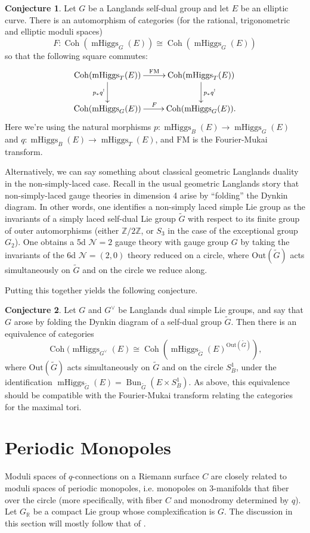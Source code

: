 \documentclass[11pt, oneside, reqno]{amsart}
\theoremstyle{definition} \newtheorem{definition}{Definition}[section]
\newtheorem{conjecture}[definition]{Conjecture}
\theoremstyle{definition} \newtheorem{remark}[definition]{Remark}
\theoremstyle{definition} \newtheorem{remarks}[definition]{Remarks}
\theoremstyle{definition} \newtheorem{question}[definition]{Question}
\theoremstyle{definition} \newtheorem*{note}{Note}
\theoremstyle{definition} \newtheorem{example}[definition]{Example}
\theoremstyle{definition} \newtheorem{examples}[definition]{Examples}
\newcommand{\mr}[1]{\mathrm{#1}}
\newcommand{\mc}[1]{\mathcal{#1}}
\newcommand{\wt}[1]{\widetilde{#1}}
\newcommand{\RR}{\mathbb{R}}
\newcommand{\ZZ}{\mathbb{Z}}
\newcommand{\iso}{\cong}
\DeclareMathOperator{\coh}{Coh}
\DeclareMathOperator{\bun}{Bun}
\DeclareMathOperator{\mhiggs}{mHiggs}
\begin{document}
\begin{conjecture}
Let $G$ be a Langlands self-dual group and let $E$ be an elliptic curve.  There is an automorphism of categories (for the rational, trigonometric and elliptic moduli spaces)
\[F \colon \coh(\mhiggs_G(E)) \iso \coh(\mhiggs_{G}(E))\]
so that the following square commutes:
\[\xymatrix{
\coh(\mhiggs_T(E)) \ar[r]^{\mathrm{FM}} \ar[d]_{p_*q^!} &\coh(\mhiggs_T(E)) \ar[d]^{p_*q^!} \\
\coh(\mhiggs_G(E)) \ar[r]^{F} &\coh(\mhiggs_G(E)).
}\]
Here we're using the natural morphisms $p \colon \mhiggs_B(E) \to \mhiggs_G(E)$ and $q \colon \mhiggs_B(E) \to \mhiggs_T(E)$, and $\mr{FM}$ is the Fourier-Mukai transform.
\end{conjecture}

Alternatively, we can say something about classical geometric Langlands duality in the non-simply-laced case.  Recall in the usual geometric Langlands story that non-simply-laced gauge theories in dimension 4 arise by ``folding'' the Dynkin diagram.  In other words, one identifies a non-simply laced simple Lie group as the invariants of a simply laced self-dual Lie group $\wt G$ with respect to its finite group of outer automorphisms (either $\ZZ/2\ZZ$, or $S_3$ in the case of the exceptional group $G_2$).  One obtains a 5d $\mc N=2$ gauge theory with gauge group $G$ by taking the invariants of the 6d $\mc N=(2,0)$ theory reduced on a circle, where $\mr{Out}(\wt G)$ acts simultaneously on $\wt G$ and on the circle we reduce along.

Putting this together yields the following conjecture.
\begin{conjecture}
\label{eq:classical-q-langlands}
Let $G$ and $G^\vee$ be Langlands dual simple Lie groups, and say that $G$ arose by folding the Dynkin diagram of a self-dual group $\wt G$.  Then there is an equivalence of categories
\[\coh(\mhiggs_{G^\vee}(E) \iso \coh(\mhiggs_{\wt G}(E)^{\mr{Out}(\wt G)}),\]
where $\mr{Out}(\wt G)$ acts simultaneously on $\wt G$ and on the circle $S^1_B$, under the identification $\mhiggs_{\wt G}(E) = \bun_{\wt G}(E \times S^1_B)$.  As above, this equivalence should be compatible with the Fourier-Mukai transform relating the categories for the maximal tori.
\end{conjecture}


\section{Periodic Monopoles} \label{periodic_monopole_section}
Moduli spaces of $q$-connections on a Riemann surface $C$ are closely related to moduli spaces of periodic monopoles, i.e. monopoles on 3-manifolds that fiber over the circle (more specifically, with fiber $C$ and monodromy determined by $q$).  Let $G_\RR$ be a compact Lie group whose complexification is $G$.  The discussion in this section will mostly follow that of \cite{CharbonneauHurtubise, Smith}.
\end{document}
